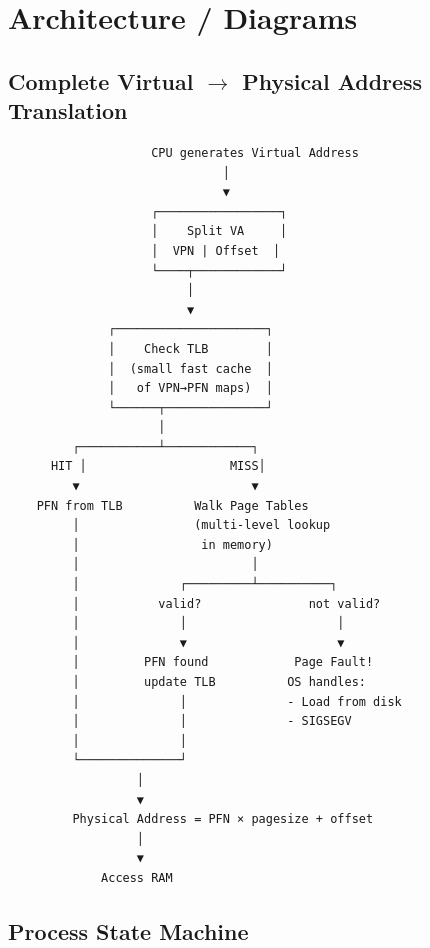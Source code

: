 \documentclass[11pt]{article}
\begin{document}
\section{Architecture / Diagrams}\label{architecture--diagrams}

\subsection{\texorpdfstring{Complete Virtual \(\rightarrow\) Physical Address Translation}{Complete Virtual \textbackslash rightarrow Physical Address Translation}}\label{complete-virtual-rightarrow-physical-address-translation}

\setcodelang{}

\begin{verbatim}
                    CPU generates Virtual Address
                              │
                              ▼
                    ┌─────────────────┐
                    │    Split VA     │
                    │  VPN | Offset  │
                    └────┬────────────┘
                         │
                         ▼
              ┌─────────────────────┐
              │    Check TLB        │
              │  (small fast cache  │
              │   of VPN→PFN maps)  │
              └──────┬──────────────┘
                     │
         ┌───────────┴────────────┐
      HIT │                    MISS│
         ▼                        ▼
    PFN from TLB          Walk Page Tables
         │                (multi-level lookup
         │                 in memory)
         │                        │
         │              ┌─────────┴──────────┐
         │           valid?               not valid?
         │              │                     │
         │              ▼                     ▼
         │         PFN found            Page Fault!
         │         update TLB          OS handles:
         │              │              - Load from disk
         │              │              - SIGSEGV
         │              │
         └──────────────┘
                  │
                  ▼
         Physical Address = PFN × pagesize + offset
                  │
                  ▼
             Access RAM
\end{verbatim}

\subsection{Process State Machine}\label{process-state-machine}

\setcodelang{}
\end{document}
